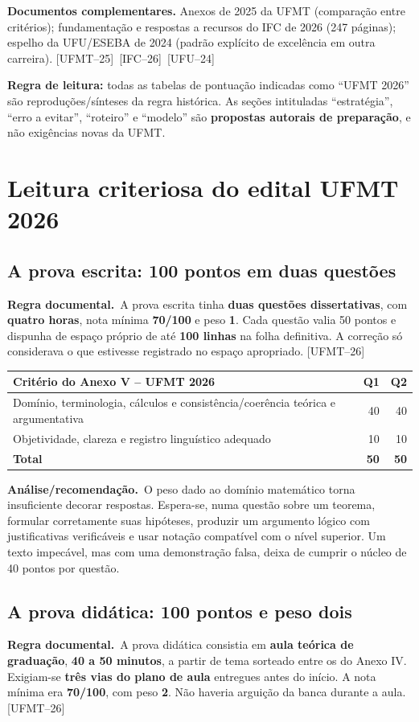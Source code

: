 \documentclass[11pt,a4paper]{article}
\newcommand{\oficial}{\textbf{Regra documental.}~}
\newcommand{\infer}{\textbf{Análise/recomendação.}~}
\newcommand{\fufmt}{\textsf{[UFMT--26]}}
\newcommand{\fufmtv}{\textsf{[UFMT--25]}}
\newcommand{\fifc}{\textsf{[IFC--26]}}
\newcommand{\fufu}{\textsf{[UFU--24]}}
\begin{document}
\textbf{Documentos complementares.} Anexos de 2025 da UFMT (comparação entre critérios); fundamentação e respostas a recursos do IFC de 2026 (247 páginas); espelho da UFU/ESEBA de 2024 (padrão explícito de excelência em outra carreira). \fufmtv\ \fifc\ \fufu

\begin{ideia}
\textbf{Regra de leitura:} todas as tabelas de pontuação indicadas como ``UFMT 2026'' são reproduções/sínteses da regra histórica. As seções intituladas ``estratégia'', ``erro a evitar'', ``roteiro'' e ``modelo'' são \textbf{propostas autorais de preparação}, e não exigências novas da UFMT.
\end{ideia}

\section{Leitura criteriosa do edital UFMT 2026}
\subsection{A prova escrita: 100 pontos em duas questões}
\oficial A prova escrita tinha \textbf{duas questões dissertativas}, com \textbf{quatro horas}, nota mínima \textbf{70/100} e peso \textbf{1}. Cada questão valia 50 pontos e dispunha de espaço próprio de até \textbf{100 linhas} na folha definitiva. A correção só considerava o que estivesse registrado no espaço apropriado. \fufmt

\begin{tabularx}{\textwidth}{Xrr}
\toprule
\textbf{Critério do Anexo V -- UFMT 2026} & \textbf{Q1} & \textbf{Q2}\\ \midrule
Domínio, terminologia, cálculos e consistência/coerência teórica e argumentativa & 40 & 40\\
Objetividade, clareza e registro linguístico adequado & 10 & 10\\ \midrule
\textbf{Total} & \textbf{50} & \textbf{50}\\ \bottomrule
\end{tabularx}

\infer O peso dado ao domínio matemático torna insuficiente decorar respostas. Espera-se, numa questão sobre um teorema, formular corretamente suas hipóteses, produzir um argumento lógico com justificativas verificáveis e usar notação compatível com o nível superior. Um texto impecável, mas com uma demonstração falsa, deixa de cumprir o núcleo de 40 pontos por questão.

\subsection{A prova didática: 100 pontos e peso dois}
\oficial A prova didática consistia em \textbf{aula teórica de graduação}, \textbf{40 a 50 minutos}, a partir de tema sorteado entre os do Anexo IV. Exigiam-se \textbf{três vias do plano de aula} entregues antes do início. A nota mínima era \textbf{70/100}, com peso \textbf{2}. Não haveria arguição da banca durante a aula. \fufmt
\end{document}
